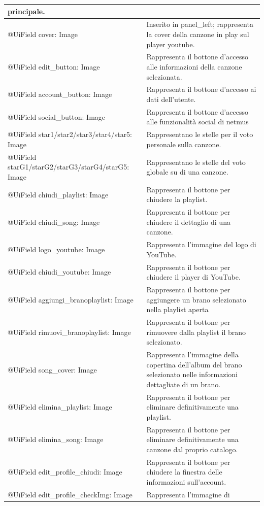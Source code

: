 \begin{longtable}{|p{}|p{}|}
principale.\\\hline
@UiField cover: Image & Inserito in panel\_left; rappresenta la cover della
canzone in play sul player youtube.\\\hline
@UiField edit\_button: Image & Rappresenta il bottone d'accesso alle
informazioni della canzone selezionata.\\\hline
@UiField account\_button: Image & Rappresenta il bottone d'accesso ai
dati dell'utente.\\\hline
@UiField social\_button: Image & Rappresenta il bottone d'accesso alle
funzionalit\`a social di netmus\\\hline
@UiField star1/star2/star3/star4/star5: Image & Rappresentano le stelle
per il voto personale sulla canzone.\\\hline
@UiField starG1/starG2/starG3/starG4/starG5: Image & Rappresentano le
stelle del voto globale su di una canzone.\\\hline
@UiField chiudi\_playlist: Image & Rappresenta il bottone per chiudere la
playlist.\\\hline @UiField chiudi\_song: Image & Rappresenta il bottone
per chiudere il dettaglio di una canzone.\\\hline
@UiField logo\_youtube: Image & Rappresenta l'immagine del logo di
YouTube.\\\hline
@UiField chiudi\_youtube: Image & Rappresenta il bottone per chiudere il
player di YouTube.\\\hline
@UiField aggiungi\_branoplaylist: Image & Rappresenta il bottone per
aggiungere un brano selezionato nella playlist aperta\\\hline
@UiField rimuovi\_branoplaylist: Image & Rappresenta il bottone per
rimuovere dalla playlist il brano selezionato.\\\hline
@UiField song\_cover: Image & Rappresenta l'immagine della copertina
dell'album del brano selezionato nelle informazioni dettagliate di un
brano.\\\hline
@UiField elimina\_playlist: Image & Rappresenta il bottone per eliminare
definitivamente una playlist.\\\hline
@UiField elimina\_song: Image & Rappresenta il bottone per eliminare
definitivamente una canzone dal proprio catalogo. \\\hline
@UiField edit\_profile\_chiudi: Image & Rappresenta il bottone per
chiudere la finestra delle informazioni sull'account.\\\hline
@UiField edit\_profile\_checkImg: Image & Rappresenta l'immagine di

\end{longtable}

